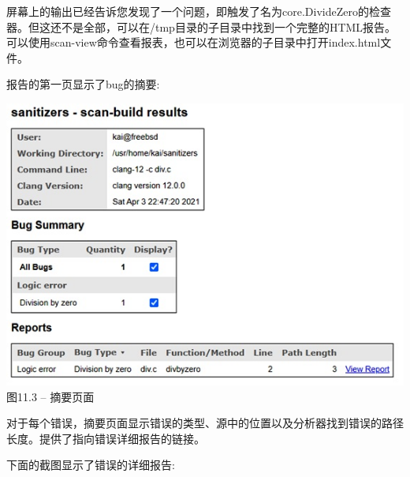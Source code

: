屏幕上的输出已经告诉您发现了一个问题，即触发了名为core.DivideZero的检查器。但这还不是全部，可以在/tmp目录的子目录中找到一个完整的HTML报告。可以使用scan-view命令查看报表，也可以在浏览器的子目录中打开index.html文件。\par

报告的第一页显示了bug的摘要:\par

\hspace*{\fill} \par %
\begin{center}
\includegraphics[width=1\textwidth]{content/3/chapter11/images/3.jpg}\\
图11.3 – 摘要页面
\end{center}

对于每个错误，摘要页面显示错误的类型、源中的位置以及分析器找到错误的路径长度。提供了指向错误详细报告的链接。\par

下面的截图显示了错误的详细报告:\par



